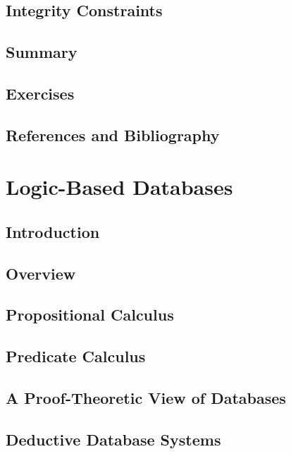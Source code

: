 \documentclass{book}
\begin{document}
\section{Integrity Constraints}

\section{Summary}

\section{Exercises}

\section{References and Bibliography}








\chapter{Logic-Based Databases}

\section{Introduction}

\section{Overview}

\section{Propositional Calculus}

\section{Predicate Calculus}

\section{A Proof-Theoretic View of Databases}

\section{Deductive Database Systems}
\end{document}

